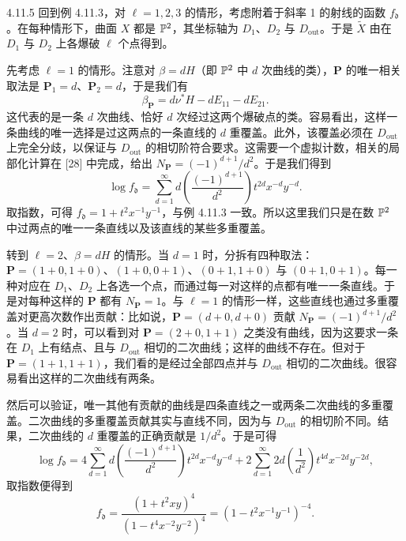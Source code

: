 \begin{example}{4.11.5}
回到例 4.11.3，对 $\ell=1,2,3$ 的情形，考虑附着于斜率 1 的射线的函数 $f_\mathfrak{d}$。在每种情形下，曲面 $X$ 都是 $\mathbb{P}^2$，其坐标轴为 $D_1$、$D_2$ 与 $D_{\mathrm{out}}$。于是 $\tilde X$ 由在 $D_1$ 与 $D_2$ 上各爆破 $\ell$ 个点得到。

先考虑 $\ell=1$ 的情形。注意对 $\beta=dH$（即 $\mathbb{P}^2$ 中 $d$ 次曲线的类），$\mathbf{P}$ 的唯一相关取法是 $\mathbf{P}_1=d$、$\mathbf{P}_2=d$，于是我们有
\[
\beta_{\mathbf{P}}=d\nu^*H-dE_{11}-dE_{21}.
\]
这代表的是一条 $d$ 次曲线、恰好 $d$ 次经过这两个爆破点的类。容易看出，这样一条曲线的唯一选择是过这两点的一条直线的 $d$ 重覆盖。此外，该覆盖必须在 $D_{\mathrm{out}}$ 上完全分歧，以保证与 $D_{\mathrm{out}}$ 的相切阶符合要求。这需要一个虚拟计数，相关的局部化计算在 [28] 中完成，给出 $N_{\mathbf{P}}=(-1)^{d+1}/d^2$。于是我们得到
\[
\log f_\mathfrak{d}=\sum_{d=1}^{\infty}d\left(\frac{(-1)^{d+1}}{d^{2}}\right)t^{2d}x^{-d}y^{-d}.
\]
取指数，可得 $f_\mathfrak{d}=1+t^{2}x^{-1}y^{-1}$，与例 4.11.3 一致。所以这里我们只是在数 $\mathbb{P}^2$ 中过两点的唯一一条直线以及该直线的某些多重覆盖。

转到 $\ell=2$、$\beta=dH$ 的情形。当 $d=1$ 时，分拆有四种取法：$\mathbf{P}=(1+0,1+0)$、$(1+0,0+1)$、$(0+1,1+0)$ 与 $(0+1,0+1)$。每一种对应在 $D_1$、$D_2$ 上各选一个点，而通过每一对这样的点都有唯一一条直线。于是对每种这样的 $\mathbf{P}$ 都有 $N_{\mathbf{P}}=1$。与 $\ell=1$ 的情形一样，这些直线也通过多重覆盖对更高次数作出贡献：比如说，$\mathbf{P}=(d+0,d+0)$ 贡献 $N_{\mathbf{P}}=(-1)^{d+1}/d^{2}$。当 $d=2$ 时，可以看到对 $\mathbf{P}=(2+0,1+1)$ 之类没有曲线，因为这要求一条在 $D_1$ 上有结点、且与 $D_{\mathrm{out}}$ 相切的二次曲线；这样的曲线不存在。但对于 $\mathbf{P}=(1+1,1+1)$，我们看的是经过全部四点并与 $D_{\mathrm{out}}$ 相切的二次曲线。很容易看出这样的二次曲线有两条。

然后可以验证，唯一其他有贡献的曲线是四条直线之一或两条二次曲线的多重覆盖。二次曲线的多重覆盖贡献其实与直线不同，因为与 $D_{\mathrm{out}}$ 的相切阶不同。结果，二次曲线的 $d$ 重覆盖的正确贡献是 $1/d^{2}$。于是可得
\[
\log f_\mathfrak{d}=4\sum_{d=1}^{\infty}d\left(\frac{(-1)^{d+1}}{d^{2}}\right)t^{2d}x^{-d}y^{-d}+2\sum_{d=1}^{\infty}2d\left(\frac{1}{d^{2}}\right)t^{4d}x^{-2d}y^{-2d},
\]
取指数便得到
\[
f_\mathfrak{d}=\frac{(1+t^{2}xy)^{4}}{(1-t^{4}x^{-2}y^{-2})^{4}}=(1-t^{2}x^{-1}y^{-1})^{-4}.
\]
\end{example}
